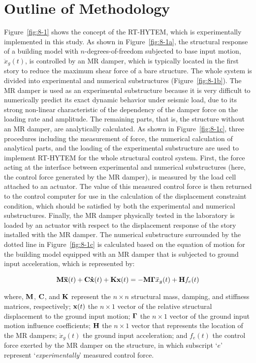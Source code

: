 \section{Outline of Methodology}
Figure~\ref{fig:8-1} shows the concept of the RT-HYTEM, which is experimentally implemented in this study. As shown in Figure~\ref{fig:8-1a}, the structural response of a building model with $n$-degrees-of-freedom subjected to base input motion, $\ddot{x}_{g}(t)$, is controlled by an MR damper, which is typically located in the first story to reduce the maximum shear force of a bare structure. The whole system is divided into experimental and numerical substructures (Figure~\ref{fig:8-1b}). The MR damper is used as an experimental substructure because it is very difficult to numerically predict its exact dynamic behavior under seismic load, due to its strong non-linear characteristic of the dependency of the damper force on the loading rate and amplitude. The remaining parts, that is, the structure without an MR damper, are analytically calculated. As shown in Figure~\ref{fig:8-1c}, three procedures including the measurement of force, the numerical calculation of analytical parts, and the loading of the experimental substructure are used to implement RT-HYTEM for the whole structural control system\citep{blakeborough2001development}. First, the force acting at the interface between experimental and numerical substructures (here, the control force generated by the MR damper), is measured by the load cell attached to an actuator. The value of this measured control force is then returned to the control computer for use in the calculation of the displacement constraint condition, which should be satisfied by both the experimental and numerical substructures. Finally, the MR damper physically tested in the laboratory is loaded by an actuator with respect to the displacement response of the story installed with the MR damper. The numerical substructure surrounded by the dotted line in Figure~\ref{fig:8-1c} is calculated based on the equation of motion for the building model equipped with an MR damper that is subjected to ground input acceleration, which is represented by:

\begin{equation}\label{eq:8-1}
\mathbf{M}\mathbf{\ddot{x}}(t)+\mathbf{C}\mathbf{\dot{x}}(t)+\mathbf{K}\mathbf{x}(t) = -\mathbf{M}\mathbf{\Gamma}\ddot{x}_{g}(t)+\mathbf{H}f_{e}(t)
\end{equation}

where, $\mathbf{M}$, $\mathbf{C}$, and $\mathbf{K}$ represent the $n \times n$ structural mass, damping, and stiffness matrices, respectively; $\mathbf{x}(t)$ the $n\times 1$ vector of the relative structural displacement to the ground input motion; $\mathbf{\Gamma}$ the $n\times1$ vector of the ground input motion influence coefficients; $\mathbf{H}$ the $n \times 1$ vector that represents the location of the MR dampers; $\ddot{x}_{g}(t)$ the ground input acceleration; and $f_{e}(t)$ the
control force exerted by the MR damper on the structure, in which subscript `$e$' represent `\textit{experimentally}' measured control force.

